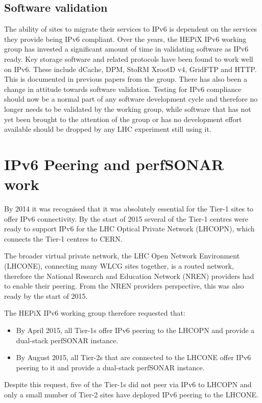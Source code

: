 \documentclass[a4paper]{jpconf}
\begin{document}
\subsection{Software validation}
The ability of sites to migrate their services to IPv6 is dependent on the services they provide being IPv6 compliant.  Over the years, the HEPiX IPv6 working group has invested a significant amount of time in validating software as IPv6 ready.  Key storage software and related protocols have been found to work well on IPv6. These include dCache, DPM, StoRM XrootD v4, GridFTP and HTTP. This is documented in previous papers from the group\cite{CHEP15}.  There has also been a change in attitude towards software validation.  Testing for IPv6 compliance should now be a normal part of any software development cycle and therefore no longer needs to be validated by the working group, while software that has not yet been brought to the attention of the group or has no development effort available should be dropped by any 
LHC experiment still using it.  

\section{IPv6 Peering and perfSONAR work}
By 2014 it was recognised that it was absolutely essential for the Tier-1 sites to offer
IPv6 connectivity.  By the start of 2015 several of the Tier-1 centres were ready to support IPv6 for the LHC Optical Private Network (LHCOPN), which connects the Tier-1 centres to CERN.

The broader virtual private network, the LHC Open Network Environment (LHCONE), connecting many WLCG sites together, is a routed network,
therefore the National Research and Education Network (NREN) providers had to enable their peering. From the NREN providers perspective, this was also ready by the start of 2015.  

The HEPiX IPv6 working group therefore requested that:
\begin{itemize}
\item By April 2015, all Tier-1s offer IPv6 peering to the LHCOPN and provide
  a dual-stack perfSONAR instance.
\item By August 2015, all Tier-2s that are connected to the LHCONE offer IPv6 peering to it and provide
  a dual-stack perfSONAR instance.
\end{itemize}
Despite this request, five of the Tier-1s did not peer via IPv6 to LHCOPN and only a small 
number of Tier-2 sites have deployed IPv6 peering to the LHCONE.
\end{document}
